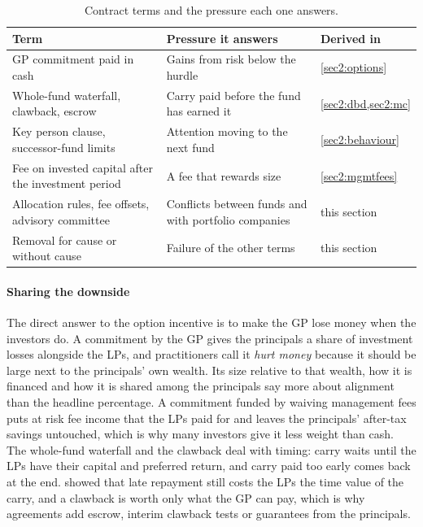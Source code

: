 \begin{chapterrefs}
\begin{table}[t]
  \centering
  \caption{Contract terms and the pressure each one answers.}
  \label{tab2:terms}
  \small
  \begin{tabular}{@{}>{\raggedright\arraybackslash}p{}>{\raggedright\arraybackslash}p{}>{\raggedright\arraybackslash}p{}@{}}
    \toprule
    Term & Pressure it answers & Derived in\\
    \midrule
    GP commitment paid in cash & Gains from risk below the hurdle & \cref{sec2:options}\\
    Whole-fund waterfall, clawback, escrow & Carry paid before the fund has earned it & \cref{sec2:dbd,sec2:mc}\\
    Key person clause, successor-fund limits & Attention moving to the next fund & \cref{sec2:behaviour}\\
    Fee on invested capital after the investment period & A fee that rewards size & \cref{sec2:mgmtfees}\\
    Allocation rules, fee offsets, advisory committee & Conflicts between funds and with portfolio companies & this section\\
    Removal for cause or without cause & Failure of the other terms & this section\\
    \bottomrule
  \end{tabular}
\end{table}

\paragraph{Sharing the downside}
The direct answer to the option incentive is to make the GP lose money when the investors do. A
commitment by the GP gives the principals a share of investment losses alongside the LPs, and
practitioners call it \emph{hurt money} because it should be large next to the principals' own wealth.
Its size relative to that wealth, how it is financed and how it is shared among the principals say
more about alignment than the headline percentage. A commitment funded by waiving management fees
puts at risk fee income that the LPs paid for and leaves the principals' after-tax savings untouched,
which is why many investors give it less weight than cash.
The whole-fund waterfall and the clawback deal with timing: carry waits until the LPs have their
capital and preferred return, and carry paid too early comes back at the end.  showed
that late repayment still costs the LPs the time value of the carry, and a clawback is worth only what
the GP can pay, which is why agreements add escrow, interim clawback tests or guarantees from the
principals.


\end{chapterrefs}
